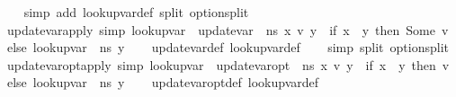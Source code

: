 \begin{isabellebody}
\isadelimproof
\ \ %
\endisadelimproof
%
\isatagproof
{}\isamarkupfalse%
\ {\isacharparenleft}{\kern0pt}simp\ add{\isacharcolon}{\kern0pt}\ lookup{\isacharunderscore}{\kern0pt}var{\isacharunderscore}{\kern0pt}def\ split{\isacharcolon}{\kern0pt}\ option{\isachardot}{\kern0pt}split{\isacharparenright}{\kern0pt}%
\endisatagproof
{\isafoldproof}%
%
\isadelimproof
%
\endisadelimproof
\isanewline
\isanewline
{}\isamarkupfalse%
\ update{\isacharunderscore}{\kern0pt}var{\isacharunderscore}{\kern0pt}apply\ {\isacharbrackleft}{\kern0pt}simp{\isacharbrackright}{\kern0pt}{\isacharcolon}{\kern0pt}\ {\isachardoublequoteopen}lookup{\isacharunderscore}{\kern0pt}var\ {\isasymLambda}\ {\isacharparenleft}{\kern0pt}update{\isacharunderscore}{\kern0pt}var\ {\isasymLambda}\ n{\isacharunderscore}{\kern0pt}s\ x\ v{\isacharparenright}{\kern0pt}\ y\ {\isacharequal}{\kern0pt}\ {\isacharparenleft}{\kern0pt}if\ x\ {\isacharequal}{\kern0pt}\ y\ then\ Some\ v\ else\ lookup{\isacharunderscore}{\kern0pt}var\ {\isasymLambda}\ n{\isacharunderscore}{\kern0pt}s\ y{\isacharparenright}{\kern0pt}{\isachardoublequoteclose}\isanewline
%
\isadelimproof
\ \ %
\endisadelimproof
%
\isatagproof
{}\isamarkupfalse%
\ update{\isacharunderscore}{\kern0pt}var{\isacharunderscore}{\kern0pt}def\ lookup{\isacharunderscore}{\kern0pt}var{\isacharunderscore}{\kern0pt}def\isanewline
\ \ \isamarkupfalse%
\ {\isacharparenleft}{\kern0pt}simp\ split{\isacharcolon}{\kern0pt}\ option{\isachardot}{\kern0pt}split{\isacharparenright}{\kern0pt}%
\endisatagproof
{\isafoldproof}%
%
\isadelimproof
\isanewline
%
\endisadelimproof
\isanewline
{}\isamarkupfalse%
\ update{\isacharunderscore}{\kern0pt}var{\isacharunderscore}{\kern0pt}opt{\isacharunderscore}{\kern0pt}apply\ {\isacharbrackleft}{\kern0pt}simp{\isacharbrackright}{\kern0pt}{\isacharcolon}{\kern0pt}\ {\isachardoublequoteopen}lookup{\isacharunderscore}{\kern0pt}var\ {\isasymLambda}\ {\isacharparenleft}{\kern0pt}update{\isacharunderscore}{\kern0pt}var{\isacharunderscore}{\kern0pt}opt\ {\isasymLambda}\ n{\isacharunderscore}{\kern0pt}s\ x\ v{\isacharparenright}{\kern0pt}\ y\ {\isacharequal}{\kern0pt}\ {\isacharparenleft}{\kern0pt}if\ x\ {\isacharequal}{\kern0pt}\ y\ then\ v\ else\ lookup{\isacharunderscore}{\kern0pt}var\ {\isasymLambda}\ n{\isacharunderscore}{\kern0pt}s\ y{\isacharparenright}{\kern0pt}{\isachardoublequoteclose}\isanewline
%
\isadelimproof
\ \ %
\endisadelimproof
%
\isatagproof
{}\isamarkupfalse%
\ update{\isacharunderscore}{\kern0pt}var{\isacharunderscore}{\kern0pt}opt{\isacharunderscore}{\kern0pt}def\ lookup{\isacharunderscore}{\kern0pt}var{\isacharunderscore}{\kern0pt}def\isanewline

\end{isabellebody}
